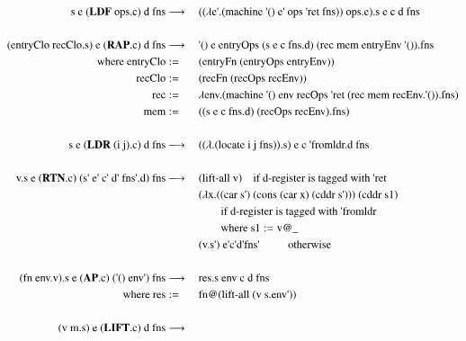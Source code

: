\documentclass[a4paper,12pt,twoside,openright]{report}
\theoremstyle{definition}
\newcommand{\ts}{\textquotesingle}
\begin{document}
\begin{figure}[ht!]
\centering
\begin{alignat}{5}
		\text{s e (} \mathbf{LDF} \text{ ops.c) d fns} & \longrightarrow \: && \text{(($\lambda$e{\ts}.(machine {\ts}() e{\ts} ops {\ts}ret fns)) ops.e).s e c d fns} \label{eq:secd_sem_ldf} \\
		\nonumber \\%
		\text{(entryClo recClo.s) e (} \mathbf{RAP}\text{.c) d fns} & \longrightarrow \: && \text{{\ts}() e entryOps (s e c fns.d) (rec mem entryEnv {\ts}()).fns} \label{eq:secd_sem_rap} \\
		\text{where entryClo} & := && \text{(entryFn (entryOps entryEnv))} \nonumber \\
		\text{recClo} & := && \text{(recFn (recOps recEnv))} \nonumber \\
		\text{rec} & := && \text{$\lambda$env.(machine {\ts}() env recOps {\ts}ret (rec mem recEnv.{\ts}()).fns)} \nonumber \\
		\text{mem} & := && \text{((s e c fns.d) (recOps recEnv).fns)} \nonumber \\
		\nonumber \\%
		\text{s e (} \mathbf{LDR} \text{ (i j).c) d fns} & \longrightarrow \: && \text{(($\lambda$.(locate i j fns)).s) e c {\ts}fromldr.d fns} \\
		\nonumber \\%
		\text{v.s e (} \mathbf{RTN}\text{.c) (s{\ts} e{\ts} c{\ts}  d{\ts}  fns{\ts}.d) fns} & \longrightarrow \:
		 && \text{(lift-all v)} 									\quad	\text{if d-register is tagged with {\ts}ret}	\\
		 & && \text{($\lambda$x.((car s{\ts}) (cons (car x) (cddr s{\ts}))) (cddr s1)	} \nonumber \\
		 & && \qquad\text{if d-register is tagged with {\ts}fromldr} \nonumber \\
		 & && \qquad\text{where s1} := \text{v@\_} \nonumber \\
 		 & && \text{(v.s\ts)  e\ts  c\ts  d\ts  fns\ts}	\qquad\;\;\text{otherwise} \nonumber \\
 		\nonumber \\%
		\text{(fn env.v).s e (} \mathbf{AP}\text{.c) ({\ts}() env{\ts}) fns} & \longrightarrow \: && \text{res.s env c d fns} \\
		\text{where res} & := && \text{fn@(lift-all (v s.env{\ts}))\textbf{\textbf{}}} \nonumber \\
		\nonumber \\%
		\text{(v m.s) e (} \mathbf{LIFT}\text{.c) d fns} & \longrightarrow \: \label{eq:secd_sem_lift}

\end{alignat}
\end{figure}
\end{document}
